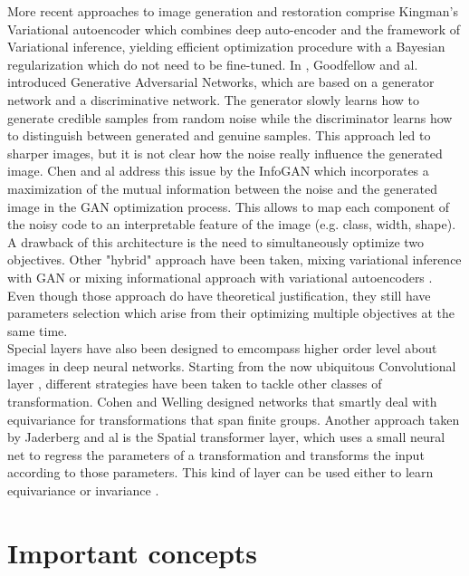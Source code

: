 \documentclass[letterpaper, twoside]{article}
\begin{document}
    More recent approaches to image generation and restoration comprise Kingman's Variational autoencoder \cite{Kingma.aevb} which combines deep auto-encoder and the framework of Variational inference, yielding efficient optimization procedure with a Bayesian regularization which do not need to be fine-tuned. In \cite{Goodfellow.gan}, Goodfellow and al. introduced Generative Adversarial Networks, which are based on a generator network and a discriminative network. The generator slowly learns how to generate credible samples from random noise while the discriminator learns how to distinguish between generated and genuine samples. This approach led to sharper images, but it is not clear how the noise really influence the generated image. Chen and al address this issue by the InfoGAN \cite{chen.infogan} which incorporates a maximization of the mutual information between the noise and the generated image in the GAN optimization process. This allows to map each component of the noisy code to an interpretable feature of the image (e.g. class, width, shape). A drawback of this architecture is the need to simultaneously optimize two objectives. Other "hybrid" approach have been taken, mixing variational inference with GAN \cite{Mescheder.advvae} or mixing informational approach with variational autoencoders \cite{Zhao.infoVAE}. Even though those approach do have theoretical justification, they still have parameters selection which arise from their optimizing multiple objectives at the same time.\\

    Special layers have also been designed to emcompass higher order level about images in deep neural networks. Starting from the now ubiquitous Convolutional layer \cite{lecun-gradientbased-learning-applied-1998}, different strategies have been taken to tackle other classes of transformation. Cohen and Welling \cite{cohen.groupequi} designed networks that smartly deal with equivariance for transformations that span finite groups. Another approach taken by Jaderberg and al \cite{Jaderberg.stn} is the Spatial transformer layer, which uses a small neural net to regress the parameters of a transformation and transforms the input according to those parameters. This kind of layer can be used either to learn equivariance or invariance \cite{Jaderberg.stn}.

\section{Important concepts}
\end{document}
